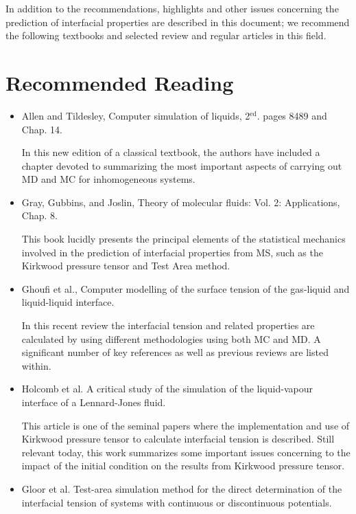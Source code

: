 \documentclass{scrbook}
\begin{document}
In addition to the recommendations, highlights and other issues concerning the
prediction of interfacial properties are described in this document; we
recommend the following textbooks and selected review and regular articles in
this field. 

\section{Recommended Reading}
\begin{itemize}
\item Allen and Tildesley, Computer simulation of liquids, 2$^{\mathrm{ed}}$. pages 84\textendash{}89 and Chap. 14. \citep{allen2017}

In this new edition of a classical textbook, the authors have included a chapter devoted to summarizing the most important aspects of carrying out MD and MC for inhomogeneous systems.

\item Gray, Gubbins, and Joslin, Theory of molecular fluids: Vol. 2: Applications, Chap. 8. \citep{gray2011}

This book lucidly presents the principal elements of the statistical mechanics involved in the prediction of interfacial properties from MS, such as the Kirkwood pressure tensor and Test Area method.

\item Ghoufi et al., Computer modelling of the surface tension of the gas-liquid and liquid-liquid interface. \citep{ghoufi2016}

  In this recent review the interfacial tension and related properties are calculated by using different methodologies using both MC and MD. A significant number of key references as well as previous reviews are listed within.

\item Holcomb et al. A critical study of the simulation of the liquid-vapour
  interface of a Lennard-Jones fluid. \citep{holcomb1993}

  This article is one of
  the seminal papers where the implementation and use of Kirkwood pressure
  tensor to calculate interfacial tension is described. Still relevant today,
  this work summarizes some important issues concerning to the impact of the
  initial condition on the results from Kirkwood pressure tensor.

\item Gloor et al. Test-area simulation method for the direct determination of the interfacial tension of systems with continuous or discontinuous potentials. \citep{gloor2005}
  

\end{itemize}
\end{document}
